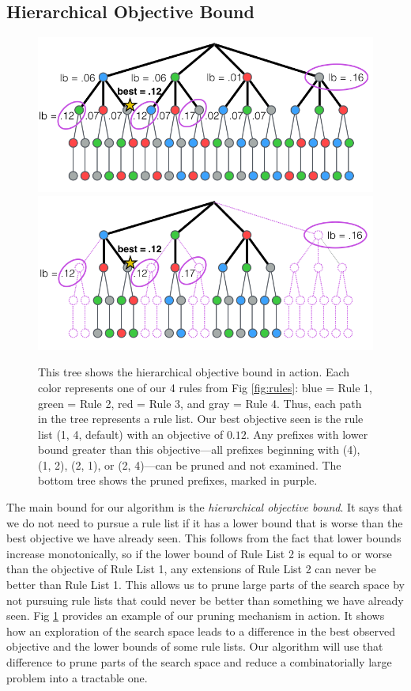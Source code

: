 \subsection{Hierarchical Objective Bound}
\begin{figure}[t!]
\includegraphics[width=\textwidth]{figs/branch-and-bound-tree.png}
\includegraphics[width=\textwidth]{figs/branch-and-bound-tree-pruned.png}
\caption[Objective bound]{This tree shows the hierarchical objective bound in action.
Each color represents one of our 4 rules from Fig \ref{fig:rules}: blue = Rule 1, green = Rule 2, red = Rule 3, and gray = Rule 4.
Thus, each path in the tree represents a rule list.
Our best objective seen is the rule list (1, 4, default) with an objective of $0.12$.
Any prefixes with lower bound greater than this objective---all prefixes beginning with (4), (1, 2), (2, 1), or (2, 4)---can be pruned and not examined.
The bottom tree shows the pruned prefixes, marked in purple.
\label{fig:objective-bound}}
\end{figure}

The main bound for our algorithm is the \textit{hierarchical objective bound}. 
It says that we do not need to pursue a rule list if it has a lower bound that is worse than the best objective we have already seen.
This follows from the fact that lower bounds increase monotonically, so if the lower bound of Rule List 2 is equal to or worse than the objective of Rule List 1, any extensions of Rule List 2 can never be better than Rule List 1.
This allows us to prune large parts of the search space by not pursuing rule lists that could never be better than something we have already seen.
Fig \ref{fig:objective-bound} provides an example of our pruning mechanism in action.
It shows how an exploration of the search space leads to a difference in the best observed objective and the lower bounds of some rule lists.
Our algorithm will use that difference to prune parts of the search space and reduce a combinatorially large problem into a tractable one.

